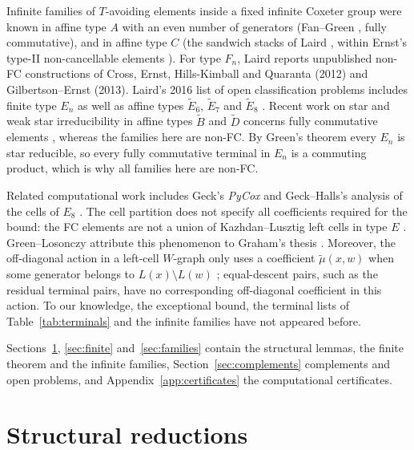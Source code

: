\documentclass[10pt]{article}
\theoremstyle{remark}
\begin{document}
Infinite families of $T$-avoiding elements inside a fixed infinite Coxeter group
were known in affine type $A$ with an even number of generators
(Fan--Green \cite[Proposition~3.1.2]{FanGreen}, fully commutative), and
in affine type $C$ (the sandwich stacks of Laird \cite[\S2.3, Figures~2.8--2.9]{Laird},
within Ernst's type-II non-cancellable elements \cite[\S3.2]{Ernst}).
For type $F_n$, Laird \cite[\S3.3]{Laird} reports unpublished non-FC
constructions of Cross, Ernst, Hills-Kimball and Quaranta (2012) and
Gilbertson--Ernst (2013). Laird's 2016 list of open classification problems
includes finite type $E_n$ as well as affine types $\widetilde E_6$,
$\widetilde E_7$ and $\widetilde E_8$ \cite[\S5.3, p.~63]{Laird}.
Recent work on star and weak star irreducibility in affine types
$\widetilde B$ and $\widetilde D$ concerns fully commutative elements
\cite{BCS}, whereas the families here are non-FC. By Green's theorem
\cite[Theorem~6.3]{GreenStar} every $E_n$ is star reducible, so every fully
commutative terminal in $E_n$ is a commuting product, which is why all
families here are non-FC.

Related computational work includes Geck's \emph{PyCox}
\cite{GeckPyCox} and Geck--Halls's analysis of the cells of $E_8$
\cite{GeckHalls}. The cell partition does not specify all coefficients
required for the bound:
the FC elements are not a union of Kazhdan--Lusztig left cells in type $E$
\cite[Example~2.2.5]{GreenLosonczy}. Green--Losonczy attribute this
phenomenon to Graham's thesis \cite[\S9.9]{Graham}.
Moreover, the off-diagonal action in a left-cell $W$-graph only uses a
coefficient $\widetilde\mu(x,w)$ when some generator belongs to
$L(x)\setminus L(w)$ \cite[Remark~2.1]{GeckHalls}; equal-descent pairs,
such as the residual terminal pairs, have no corresponding off-diagonal
coefficient in this action.
To our knowledge, the exceptional bound, the terminal lists of
Table~\ref{tab:terminals} and the infinite families have not appeared before.

Sections~\ref{sec:reductions},
\ref{sec:finite} and~\ref{sec:families} contain the structural lemmas,
the finite theorem and the infinite families, Section~\ref{sec:complements}
complements and open problems, and Appendix~\ref{app:certificates} the
computational certificates.

\section{Structural reductions}\label{sec:reductions}
\end{document}
